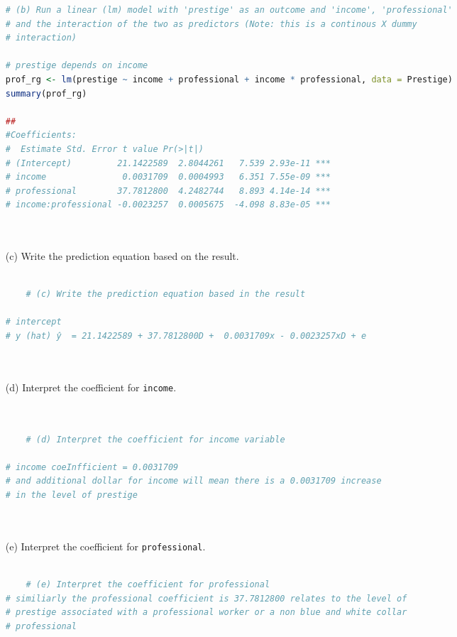 \documentclass[12pt,letterpaper]{article}
\begin{document}
\begin{enumerate}
\begin{lstlisting}[language=R]
	# (b) Run a linear (lm) model with 'prestige' as an outcome and 'income', 'professional'
# and the interaction of the two as predictors (Note: this is a continous X dummy
# interaction)

# prestige depends on income
prof_rg <- lm(prestige ~ income + professional + income * professional, data = Prestige)
summary(prof_rg)

##
#Coefficients:
#  Estimate Std. Error t value Pr(>|t|)    
# (Intercept)         21.1422589  2.8044261   7.539 2.93e-11 ***
# income               0.0031709  0.0004993   6.351 7.55e-09 ***
# professional        37.7812800  4.2482744   8.893 4.14e-14 ***
# income:professional -0.0023257  0.0005675  -4.098 8.83e-05 ***
	
	
	\end{lstlisting}
	
	\item [(c)]
	Write the prediction equation based on the result.
	
	\begin{lstlisting}[language=R]
	
	# (c) Write the prediction equation based in the result 

# intercept
# y (hat) ŷ  = 21.1422589 + 37.7812800D +  0.0031709x - 0.0023257xD + e

	
	\end{lstlisting}
	
	
\newpage
	\item [(d)]
	Interpret the coefficient for \texttt{income}.
	
	\vspace{5cm}	
	
	\begin{lstlisting}[language=R]
	
	
	# (d) Interpret the coefficient for income variable

# income coeInfficient = 0.0031709
# and additional dollar for income will mean there is a 0.0031709 increase 
# in the level of prestige 
	
	
		\end{lstlisting}
	
	\item [(e)]
	Interpret the coefficient for \texttt{professional}.
	
	
	\begin{lstlisting}[language=R]
	
	# (e) Interpret the coefficient for professional
# similiarly the professional coefficient is 37.7812800 relates to the level of
# prestige associated with a professional worker or a non blue and white collar
# professional 
	

\end{lstlisting}
\end{enumerate}
\end{document}
